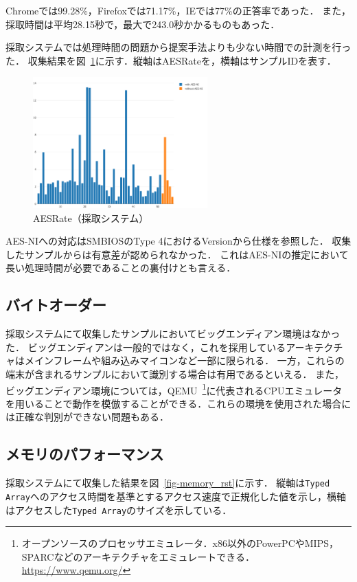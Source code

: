 Chromeでは99.28\%，Firefoxでは71.17\%，IEでは77\%の正答率であった．
また，採取時間は平均28.15秒で，最大で243.0秒かかるものもあった．

採取システムでは処理時間の問題から提案手法よりも少ない時間での計測を行った．
収集結果を図~\ref{fig-aes_rst}に示す．縦軸はAESRateを，横軸はサンプルIDを表す．

\begin{figure}[H]
    \centering
    \includegraphics[width=0.6\textwidth,pagebox=cropbox]{fig/aes_rst.pdf}
    \caption{AESRate（採取システム）}
    \label{fig-aes_rst}
\end{figure}

AES-NIへの対応はSMBIOSのType 4におけるVersionから仕様を参照した．
収集したサンプルからは有意差が認められなかった．
これはAES-NIの推定において長い処理時間が必要であることの裏付けとも言える．

\subsection{バイトオーダー}
採取システムにて収集したサンプルにおいてビッグエンディアン環境はなかった．
ビッグエンディアンは一般的ではなく，これを採用しているアーキテクチャはメインフレームや組み込みマイコンなど一部に限られる．
一方，これらの端末が含まれるサンプルにおいて識別する場合は有用であるといえる．
また，ビッグエンディアン環境については，QEMU~\footnote{オープンソースのプロセッサエミュレータ．x86以外のPowerPCやMIPS，SPARCなどのアーキテクチャをエミュレートできる．\url{https://www.qemu.org/}}に代表されるCPUエミュレータを用いることで動作を模倣することができる．これらの環境を使用された場合には正確な判別ができない問題もある．

\subsection{メモリのパフォーマンス}
採取システムにて収集した結果を図~\ref{fig-memory_rst}に示す．
縦軸は\texttt{Typed Array}へのアクセス時間を基準とするアクセス速度で正規化した値を示し，横軸はアクセスした\texttt{Typed Array}のサイズを示している．

